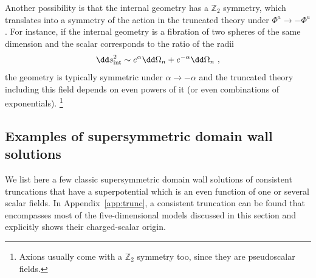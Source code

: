 Another possibility is that the internal geometry has a $\mathbb{Z}_2$ symmetry, which translates into a symmetry of the action in the truncated theory under $\Phi^a\to -\Phi^a$. For instance, if the internal geometry is a fibration of two spheres of the same dimension and the scalar corresponds to the ratio of the radii
\begin{equation}
\dd s^2_{\rm int}\sim e^{\alpha}\dd\Omega_n+e^{-\alpha} \dd\Omega_n\ ,
\end{equation}
the geometry is typically symmetric under $\alpha\to -\alpha$ and the truncated theory including this field depends on even powers of it (or even combinations of exponentials).%
\footnote{
Axions usually come with a $\mathbb{Z}_2$ symmetry too, since they are pseudoscalar fields.
}

\subsection{Examples of supersymmetric domain wall solutions}
\label{subsec:superpotential}

We list here a few classic supersymmetric domain wall solutions of consistent truncations that have a superpotential which is an even function of one or several scalar fields. In Appendix~\ref{app:trunc}, a consistent truncation can be found that encompasses most of the five-dimensional models discussed in this section and explicitly shows their charged-scalar origin. 

